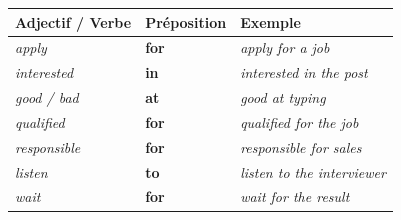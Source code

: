 \documentclass[11pt]{article}
\newcommand{\eng}[1]{\ifmmode\text{\textit{#1}}\else\begingroup\selectlanguage{english}\itshape #1\endgroup\fi}
\begin{document}
\begin{propriete}
\begin{center}
\begin{tabular}{|l|l|l|}
\hline
\rowcolor{popblueL} \textbf{Adjectif / Verbe} & \textbf{Préposition} & \textbf{Exemple} \\
\hline
\eng{apply} & \textbf{for} & \eng{apply for a job} \\
\eng{interested} & \textbf{in} & \eng{interested in the post} \\
\eng{good / bad} & \textbf{at} & \eng{good at typing} \\
\eng{qualified} & \textbf{for} & \eng{qualified for the job} \\
\eng{responsible} & \textbf{for} & \eng{responsible for sales} \\
\eng{listen} & \textbf{to} & \eng{listen to the interviewer} \\
\eng{wait} & \textbf{for} & \eng{wait for the result} \\
\hline
\end{tabular}
\end{center}
\end{propriete}
\end{document}
